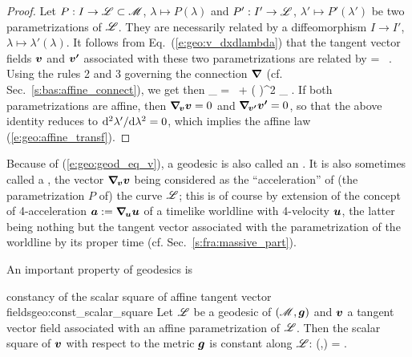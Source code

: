 \begin{proof}
Let $P: I \to  \mathscr{L}\subset\mathscr{M}$, $\lambda\mapsto P(\lambda)$ and
$P': I'\to \mathscr{L}$,
$\lambda'\mapsto P'(\lambda')$ be two
parametrizations of $\mathscr{L}$. They are necessarily related by a
diffeomorphism $I\to I'$, $\lambda \mapsto \lambda'(\lambda)$. It follows
from Eq.~(\ref{e:geo:v_dxdlambda}) that the tangent vector fields $\bm{v}$ and $\bm{v'}$
associated with these two parametrizations are related by
\be  \label{e:geo:change_tangent_vector}
     =  \,  .
\ee
Using the rules 2 and 3 governing the connection $\bm{\nabla}$ (cf. Sec.~\ref{s:bas:affine_connect}),
we get then
\be \label{e:geo:acc_v_acc_vp}
    \wnab_{\!} =  \, 
    + \left(  \right)^2 \wnab_{\!} .
\ee
If both parametrizations are affine, then $\bm{\nabla}_{\!\bm{v}}\bm{v} = 0$ and
$\bm{\nabla}_{\!\bm{v'}}\bm{v'} = 0$, so that the above identity reduces to
${\mathrm{d}^2\lambda'}/{\mathrm{d}\lambda^2} = 0$, which implies
the affine law (\ref{e:geo:affine_transf}).
\end{proof}

\begin{remark}
Because of (\ref{e:geo:geod_eq_v}), a geodesic is also called
an . It is also sometimes called
a , the
vector $\bm{\nabla}_{\!\bm{v}}\bm{v}$ being considered as the
``acceleration'' of (the parametrization $P$ of) the
curve $\mathscr{L}$; this is of course by extension of the concept of
4-acceleration $\bm{a} := \bm{\nabla}_{\!\bm{u}}\bm{u}$ of a timelike worldline
with 4-velocity $\bm{u}$, the latter being nothing but the tangent vector associated with
the parametrization of the worldline by its proper time (cf. Sec.~\ref{s:fra:massive_part}).
\end{remark}

An important property of geodesics is
\begin{tprop}{constancy of the scalar square of affine tangent vector fields}{geo:const_scalar_square}
Let $\mathscr{L}$ be a geodesic of $(\mathscr{M},\bm{g})$ and $\bm{v}$ a tangent vector field
associated with an affine parametrization of $\mathscr{L}$. Then the
scalar square of $\bm{v}$ with respect to the metric $\bm{g}$
is constant along $\mathscr{L}$:
\be \label{e:geo:vv_const}
    (,) = .
\ee
\end{tprop}

